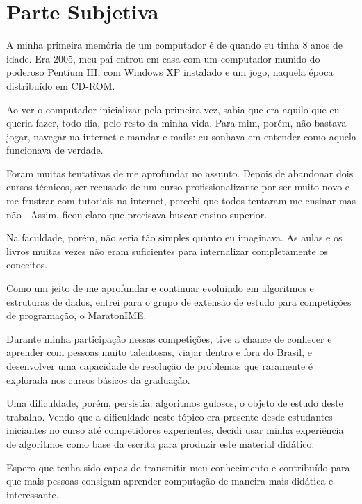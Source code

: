 \chapter{Parte Subjetiva}
\label{subjetiva}


A minha primeira memória de um computador é de quando eu tinha 8 anos de idade. Era 2005, meu pai entrou em casa com um computador munido do poderoso Pentium III, com Windows XP instalado e um jogo, naquela época distribuído em CD-ROM.

Ao ver o computador inicializar pela primeira vez, sabia que era aquilo que eu queria fazer, todo dia, pelo resto da minha vida. Para mim, porém, não bastava jogar, navegar na internet e mandar e-mails: eu sonhava em entender como aquela  funcionava de verdade.

Foram muitas tentativas de me aprofundar no assunto. Depois de abandonar dois cursos técnicos, ser recusado de um curso profissionalizante por ser muito novo e me frustrar com tutoriais na internet, percebi que todos tentaram me ensinar  mas não . Assim, ficou claro que precisava buscar ensino superior.

Na faculdade, porém, não seria tão simples quanto eu imaginava. As aulas e os livros muitas vezes não eram suficientes para internalizar completamente os conceitos.

Como um jeito de me aprofundar e continuar evoluindo em algoritmos e estruturas de dados, entrei para o grupo de extensão de estudo para competições de programação, o \href{https://www.ime.usp.br/~maratona/}{MaratonIME}.

Durante minha participação nessas competições, tive a chance de conhecer e aprender com pessoas muito talentosas, viajar dentro e fora do Brasil, e desenvolver uma capacidade de resolução de problemas que raramente é explorada nos cursos básicos da graduação.

Uma dificuldade, porém, persistia: algoritmos gulosos, o objeto de estudo deste trabalho. Vendo que a dificuldade neste tópico era presente  desde estudantes iniciantes no curso até competidores experientes, decidi usar minha experiência de algoritmos  como base da escrita para produzir este material didático.

Espero que tenha sido capaz de transmitir meu conhecimento e contribuído para que mais pessoas consigam aprender computação de maneira mais didática e interessante.